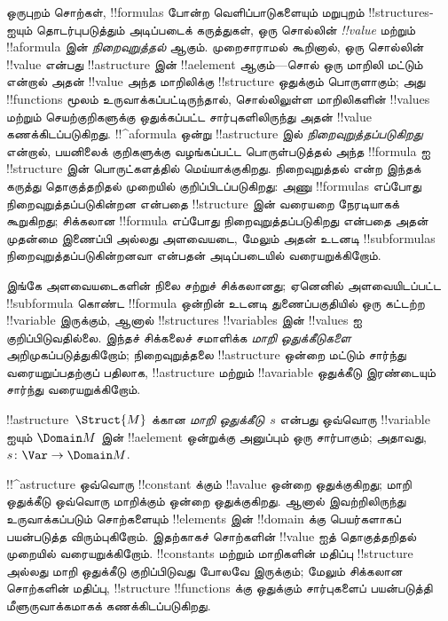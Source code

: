 \documentclass[../../../include/open-logic-section]{subfiles}
\begin{document}



\begin{explain}
ஒருபுறம் சொற்கள், !!{formula}s போன்ற வெளிப்பாடுகளையும் மறுபுறம்
!!{structure}s-ஐயும் தொடர்புபடுத்தும் அடிப்படைக் கருத்துகள், ஒரு சொல்லின்
\emph{!!{value}} மற்றும் !!a{formula} இன் \emph{நிறைவுறுத்தல்} ஆகும்.
முறைசாராமல் கூறினால், ஒரு சொல்லின் !!{value} என்பது !!a{structure} இன்
!!a{element} ஆகும்---சொல் ஒரு மாறிலி மட்டும் என்றால் அதன் !!{value} அந்த
மாறிலிக்கு !!{structure} ஒதுக்கும் பொருளாகும்; அது !!{function}s மூலம்
உருவாக்கப்பட்டிருந்தால், சொல்லிலுள்ள மாறிலிகளின் !!{value}s மற்றும்
செயற்குறிகளுக்கு ஒதுக்கப்பட்ட சார்புகளிலிருந்து அதன் !!{value}
கணக்கிடப்படுகிறது. !!^a{formula} ஒன்று !!a{structure} இல்
\emph{நிறைவுறுத்தப்படுகிறது} என்றால், பயனிலைக் குறிகளுக்கு வழங்கப்பட்ட
பொருள்படுத்தல் அந்த !!{formula} ஐ !!{structure} இன் பொருட்களத்தில்
மெய்யாக்குகிறது. நிறைவுறுத்தல் என்ற இந்தக் கருத்து தொகுத்தறிதல் முறையில்
குறிப்பிடப்படுகிறது: அணு !!{formula}s எப்போது நிறைவுறுத்தப்படுகின்றன
என்பதை !!{structure} இன் வரையறை நேரடியாகக் கூறுகிறது; சிக்கலான
!!{formula} எப்போது நிறைவுறுத்தப்படுகிறது என்பதை அதன் முதன்மை இணைப்பி
அல்லது அளவையடை, மேலும் அதன் உடனடி !!{subformula}s நிறைவுறுத்தப்படுகின்றனவா
என்பதன் அடிப்படையில் வரையறுக்கிறோம்.

இங்கே அளவையடைகளின் நிலை சற்றுச் சிக்கலானது; ஏனெனில் அளவையிடப்பட்ட
!!{subformula} கொண்ட !!{formula} ஒன்றின் உடனடி துணைப்பகுதியில் ஒரு கட்டற்ற
!!{variable} இருக்கும், ஆனால் !!{structure}s !!{variable}s இன் !!{value}s ஐ
குறிப்பிடுவதில்லை. இந்தச் சிக்கலைச் சமாளிக்க
\emph{மாறி ஒதுக்கீடுகளை} அறிமுகப்படுத்துகிறோம்; நிறைவுறுத்தலை
!!a{structure} ஒன்றை மட்டும் சார்ந்து வரையறுப்பதற்குப் பதிலாக,
!!a{structure} மற்றும் !!a{variable} ஒதுக்கீடு இரண்டையும் சார்ந்து
வரையறுக்கிறோம்.
\end{explain}

\begin{defn}[மாறி ஒதுக்கீடு]
!!a{structure}~$\Struct{M}$ க்கான \emph{மாறி ஒதுக்கீடு}~$s$ என்பது
ஒவ்வொரு !!{variable} ஐயும் $\Domain M$ இன் !!a{element} ஒன்றுக்கு
அனுப்பும் ஒரு சார்பாகும்; அதாவது, $s\colon \Var \to \Domain M$.
\end{defn}

\begin{explain}
!!^a{structure} ஒவ்வொரு !!{constant} க்கும் !!a{value} ஒன்றை ஒதுக்குகிறது;
மாறி ஒதுக்கீடு ஒவ்வொரு மாறிக்கும் ஒன்றை ஒதுக்குகிறது. ஆனால் இவற்றிலிருந்து
உருவாக்கப்படும் சொற்களையும் !!{element}s இன் !!{domain} க்கு பெயர்களாகப்
பயன்படுத்த விரும்புகிறோம். இதற்காகச் சொற்களின் !!{value} ஐத் தொகுத்தறிதல்
முறையில் வரையறுக்கிறோம். !!{constant}s மற்றும் மாறிகளின் மதிப்பு
!!{structure} அல்லது மாறி ஒதுக்கீடு குறிப்பிடுவது போலவே இருக்கும்;
மேலும் சிக்கலான சொற்களின் மதிப்பு, !!{structure} !!{function}s க்கு
ஒதுக்கும் சார்புகளைப் பயன்படுத்தி மீளுருவாக்கமாகக் கணக்கிடப்படுகிறது.
\end{explain}
\end{document}
